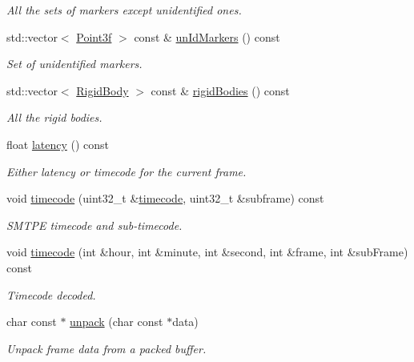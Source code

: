 \begin{DoxyCompactItemize}
\begin{DoxyCompactList}\small\item\em \-All the sets of markers except unidentified ones. \end{DoxyCompactList}\item 
\hypertarget{classMocapFrame_a70c364d5725dd792b2ab1e7ab66104cb}{std\-::vector$<$ \hyperlink{classPoint3f}{\-Point3f} $>$ const \& \hyperlink{classMocapFrame_a70c364d5725dd792b2ab1e7ab66104cb}{un\-Id\-Markers} () const }\label{classMocapFrame_a70c364d5725dd792b2ab1e7ab66104cb}

\begin{DoxyCompactList}\small\item\em \-Set of unidentified markers. \end{DoxyCompactList}\item 
\hypertarget{classMocapFrame_a07a3a094cd6cc30e7b0ad0a52bf8a03f}{std\-::vector$<$ \hyperlink{classRigidBody}{\-Rigid\-Body} $>$ const \& \hyperlink{classMocapFrame_a07a3a094cd6cc30e7b0ad0a52bf8a03f}{rigid\-Bodies} () const }\label{classMocapFrame_a07a3a094cd6cc30e7b0ad0a52bf8a03f}

\begin{DoxyCompactList}\small\item\em \-All the rigid bodies. \end{DoxyCompactList}\item 
float \hyperlink{classMocapFrame_aa5a43b1f1ac04329e15784f8131d7328}{latency} () const 
\begin{DoxyCompactList}\small\item\em \-Either latency or timecode for the current frame. \end{DoxyCompactList}\item 
void \hyperlink{classMocapFrame_a2cc6b360c320b0119403fb79f1cd1ef2}{timecode} (uint32\-\_\-t \&\hyperlink{classMocapFrame_a2cc6b360c320b0119403fb79f1cd1ef2}{timecode}, uint32\-\_\-t \&subframe) const 
\begin{DoxyCompactList}\small\item\em \-S\-M\-T\-P\-E timecode and sub-\/timecode. \end{DoxyCompactList}\item 
void \hyperlink{classMocapFrame_ad56edd4018b93a966f8e817c80e69894}{timecode} (int \&hour, int \&minute, int \&second, int \&frame, int \&sub\-Frame) const 
\begin{DoxyCompactList}\small\item\em \-Timecode decoded. \end{DoxyCompactList}\item 
char const $\ast$ \hyperlink{classMocapFrame_a4c1ef6be087c822ce82991349c13e20a}{unpack} (char const $\ast$data)
\begin{DoxyCompactList}\small\item\em \-Unpack frame data from a packed buffer. \end{DoxyCompactList}\end{DoxyCompactItemize}


